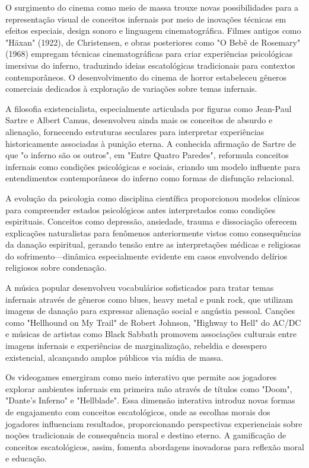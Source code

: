 O surgimento do cinema como meio de massa trouxe novas possibilidades para a representação visual de conceitos infernais por meio de inovações técnicas em efeitos especiais, design sonoro e linguagem cinematográfica. Filmes antigos como "Häxan" (1922), de Christensen, e obras posteriores como "O Bebê de Rosemary" (1968) empregam técnicas cinematográficas para criar experiências psicológicas imersivas do inferno, traduzindo ideias escatológicas tradicionais para contextos contemporâneos. O desenvolvimento do cinema de horror estabeleceu gêneros comerciais dedicados à exploração de variações sobre temas infernais.

A filosofia existencialista, especialmente articulada por figuras como Jean-Paul Sartre e Albert Camus, desenvolveu ainda mais os conceitos de absurdo e alienação, fornecendo estruturas seculares para interpretar experiências historicamente associadas à punição eterna. A conhecida afirmação de Sartre de que "o inferno são os outros", em "Entre Quatro Paredes", reformula conceitos infernais como condições psicológicas e sociais, criando um modelo influente para entendimentos contemporâneos do inferno como formas de disfunção relacional.

A evolução da psicologia como disciplina científica proporcionou modelos clínicos para compreender estados psicológicos antes interpretados como condições espirituais. Conceitos como depressão, ansiedade, trauma e dissociação oferecem explicações naturalistas para fenômenos anteriormente vistos como consequências da danação espiritual, gerando tensão entre as interpretações médicas e religiosas do sofrimento---dinâmica especialmente evidente em casos envolvendo delírios religiosos sobre condenação.

A música popular desenvolveu vocabulários sofisticados para tratar temas infernais através de gêneros como blues, heavy metal e punk rock, que utilizam imagens de danação para expressar alienação social e angústia pessoal. Canções como "Hellhound on My Trail" de Robert Johnson, "Highway to Hell" do AC/DC e músicas de artistas como Black Sabbath promovem associações culturais entre imagens infernais e experiências de marginalização, rebeldia e desespero existencial, alcançando amplos públicos via mídia de massa.

Os videogames emergiram como meio interativo que permite aos jogadores explorar ambientes infernais em primeira mão através de títulos como "Doom", "Dante’s Inferno" e "Hellblade". Essa dimensão interativa introduz novas formas de engajamento com conceitos escatológicos, onde as escolhas morais dos jogadores influenciam resultados, proporcionando perspectivas experienciais sobre noções tradicionais de consequência moral e destino eterno. A gamificação de conceitos escatológicos, assim, fomenta abordagens inovadoras para reflexão moral e educação.

